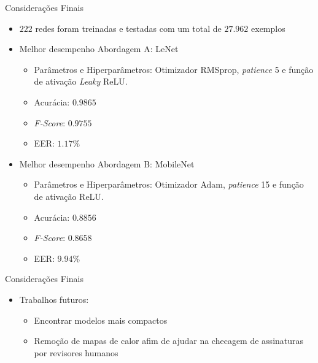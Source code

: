 
\begin{frame}{Considerações Finais}
  \baselineskip
  \begin{itemize}
    \item $222$ redes foram treinadas e testadas com um total de $27.962$ exemplos
    \pause
    \bigskip
    \item Melhor desempenho Abordagem A: LeNet
    \begin{itemize}
      \item \alert{Parâmetros e Hiperparâmetros}: Otimizador RMSprop, \emph{patience} 5 e função de ativação \emph{Leaky} ReLU.
      \item \alert{Acurácia}: $0.9865$
      \item \alert{\emph{F-Score}}: $0.9755$
      \item \alert{EER}: $1.17\%$
    \end{itemize}
    \pause
    \item Melhor desempenho Abordagem B: MobileNet
    \begin{itemize}
      \item \alert{Parâmetros e Hiperparâmetros}: Otimizador Adam, \emph{patience} 15 e função de ativação ReLU.
      \item \alert{Acurácia}: $0.8856$
      \item \alert{\emph{F-Score}}: $0.8658$
      \item \alert{EER}: $9.94\%$
    \end{itemize}
  \end{itemize}
\end{frame}

\begin{frame}{Considerações Finais}
  \begin{itemize}
    \item Trabalhos futuros:
    \begin{itemize}
      \item Encontrar modelos mais compactos
      \item Remoção de mapas de calor afim de ajudar na checagem de assinaturas por revisores humanos
    \end{itemize}
  \end{itemize}
\end{frame}
